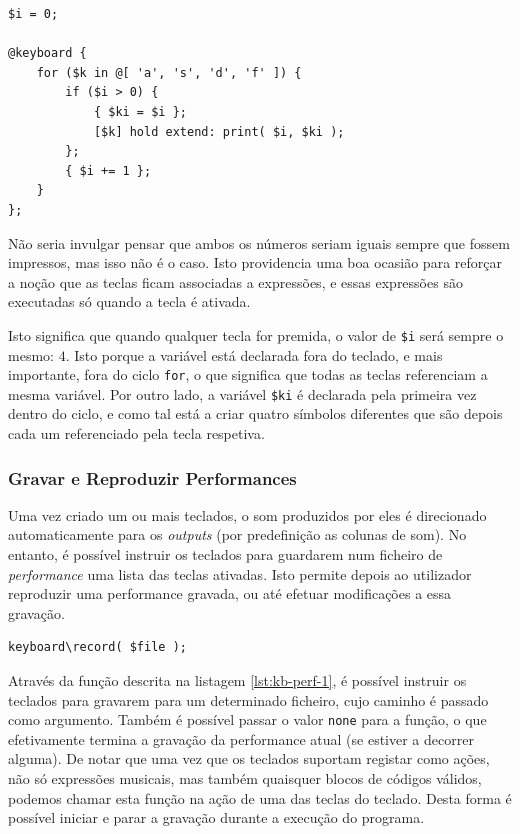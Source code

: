 \begin{lstlisting}[caption={Declaração de teclado dinâmica recorrendo ao uso de ciclos, condicionais e blocos de código.}]
$i = 0;

@keyboard {
    for ($k in @[ 'a', 's', 'd', 'f' ]) {
        if ($i > 0) {
            { $ki = $i };
            [$k] hold extend: print( $i, $ki );
        };
        { $i += 1 };
    }
};
\end{lstlisting}

Não seria invulgar pensar que ambos os números seriam iguais sempre que fossem impressos, mas isso não é o caso. Isto providencia uma boa ocasião para reforçar a noção que as teclas ficam associadas a expressões, e essas expressões são executadas só quando a tecla é ativada.

Isto significa que quando qualquer tecla for premida, o valor de \texttt{\$i} será sempre o mesmo: $4$. Isto porque a variável está declarada fora do teclado, e mais importante, fora do ciclo \texttt{for}, o que significa que todas as teclas referenciam a mesma variável. Por outro lado, a variável \texttt{\$ki} é declarada pela primeira vez dentro do ciclo, e como tal está a criar quatro símbolos diferentes que são depois cada um referenciado pela tecla respetiva.

\subsubsection{Gravar e Reproduzir Performances}
Uma vez criado um ou mais teclados, o som produzidos por eles é direcionado automaticamente para os \textit{outputs} (por predefinição as colunas de som). No entanto, é possível instruir os teclados para guardarem num ficheiro de \textit{performance} uma lista das teclas ativadas. Isto permite depois ao utilizador reproduzir uma performance gravada, ou até efetuar modificações a essa gravação.

\begin{lstlisting}[caption={Gravação de uma \textit{performance}},label={lst:kb-perf-1}]
keyboard\record( $file );
\end{lstlisting}

Através da função descrita na listagem \ref{lst:kb-perf-1}, é possível instruir os teclados para gravarem para um determinado ficheiro, cujo caminho é passado como argumento. Também é possível passar o valor \texttt{none} para a função, o que efetivamente termina a gravação da performance atual (se estiver a decorrer alguma).
De notar que uma vez que os teclados suportam registar como ações, não só expressões musicais, mas também quaisquer blocos de códigos válidos, podemos chamar esta função na ação de uma das teclas do teclado. Desta forma é possível iniciar e parar a gravação durante a execução do programa.

